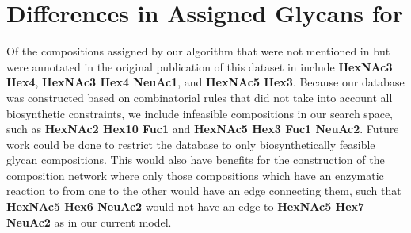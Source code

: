 \section{Differences in Assigned Glycans for \rpserum}

    Of the compositions assigned by our algorithm that were not
    mentioned in \cite{Yu2013} but were annotated in the original publication
    of this dataset in \cite{Hu2012} include \textbf{HexNAc3 Hex4},
    \textbf{HexNAc3 Hex4 NeuAc1}, and \textbf{HexNAc5 Hex3}. Because our database
    was constructed based on combinatorial rules that did not take into account
    all biosynthetic constraints, we include infeasible compositions in our search
    space, such as \textbf{HexNAc2 Hex10 Fuc1} and \textbf{HexNAc5 Hex3 Fuc1 NeuAc2}.
    Future work could be done to restrict the database to only biosynthetically
    feasible glycan compositions. This would also have benefits for the construction
    of the composition network where only those compositions which have an enzymatic
    reaction to from one to the other would have an edge connecting them, such that
    \textbf{HexNAc5 Hex6 NeuAc2} would not have an edge to \textbf{HexNAc5 Hex7 NeuAc2}
    as in our current model.